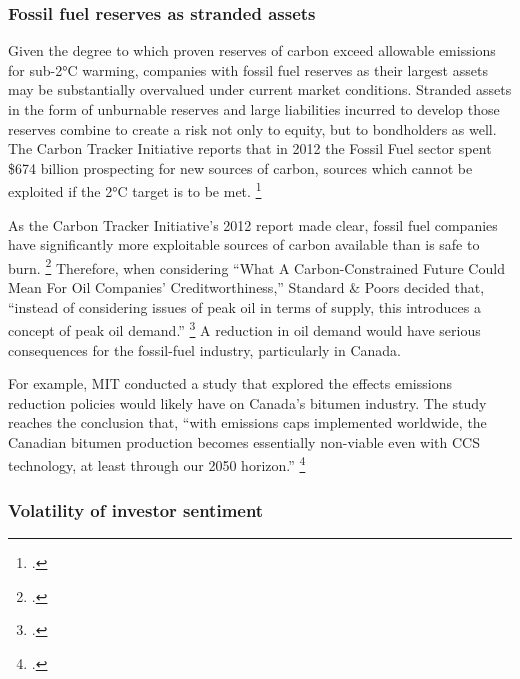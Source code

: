 	\subsubsection {Fossil fuel reserves as stranded assets} 



Given the degree to which proven reserves of carbon exceed allowable emissions for sub-2°C warming, companies with fossil fuel reserves as their largest assets may be substantially overvalued under current market conditions. 
Stranded assets in the form of unburnable reserves and large liabilities incurred to develop those reserves combine to create a risk not only to equity, but to bondholders as well.
The Carbon Tracker Initiative reports that in 2012 the Fossil Fuel sector spent \$674 billion prospecting for new sources of carbon, sources which cannot be exploited if the 2°C target is to be met. \footcite{CTI2013}



As the Carbon Tracker Initiative's 2012 report made clear, fossil fuel companies have significantly more exploitable sources of carbon available than is safe to burn. \footcite{CTI2012}
Therefore, when considering ``What A Carbon-Constrained Future Could Mean For Oil Companies' Creditworthiness,'' Standard \& Poors decided that, ``instead of considering issues of peak oil in terms of supply, this introduces a concept of peak oil demand.'' \footcite{SandPConstrained}
A reduction in oil demand would have serious consequences for the fossil-fuel industry, particularly in Canada.



For example, MIT conducted a study that explored the effects  emissions reduction policies would likely have on Canada's bitumen industry.
The study reaches the conclusion that, ``with  emissions caps implemented worldwide, the Canadian bitumen production becomes essentially non-viable even with CCS technology, at least through our 2050 horizon.'' \footcite{MITContraints}



\subsubsection {Volatility of investor sentiment}



